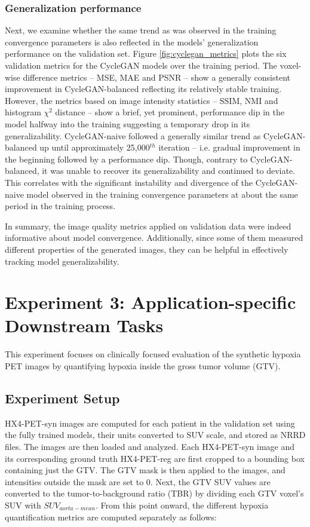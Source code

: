 \subsubsection{Generalization performance} 
Next, we examine whether the same trend as was observed in the training convergence parameters is also reflected in the models' generalization performance on the validation set. Figure \ref{fig:cyclegan_metrics} plots the six validation metrics for the CycleGAN models over the training period. The voxel-wise difference metrics -- MSE, MAE and PSNR -- show a generally consistent improvement in CycleGAN-balanced reflecting its relatively stable training. However, the metrics based on image intensity statistics -- SSIM, NMI and histogram $\chi^2$ distance -- show a brief, yet prominent, performance dip in the model halfway into the training suggesting a temporary drop in its generalizability. CycleGAN-naive followed a generally similar trend as CycleGAN-balanced up until approximately 25,000$^{th}$ iteration -- i.e. gradual improvement in the beginning followed by a performance dip. Though, contrary to CycleGAN-balanced, it was unable to recover its generalizability and continued to deviate. This correlates with the significant instability and divergence of the CycleGAN-naive model observed in the training convergence parameters at about the same period in the training process.

In summary, the image quality metrics applied on validation data were indeed informative about model convergence. Additionally, since some of them measured different properties of the generated images, they can be helpful in effectively tracking model generalizability.



\section{Experiment 3: Application-specific Downstream Tasks}
\label{Expt_3}
This experiment focuses on clinically focused evaluation of the synthetic hypoxia PET images by quantifying hypoxia inside the gross tumor volume (GTV).


\subsection{Experiment Setup}
HX4-PET-syn images are computed for each patient in the validation set using the fully trained models, their units converted to SUV scale, and stored as NRRD files. The images are then loaded and analyzed. Each HX4-PET-syn image and its corresponding ground truth HX4-PET-reg are first cropped to a bounding box containing just the GTV. The GTV mask is then applied to the images, and intensities outside the mask are set to 0. Next, the GTV SUV values are converted to the tumor-to-background ratio (TBR) by dividing each GTV voxel's SUV with $SUV_{aorta-mean}$. From this point onward, the different hypoxia quantification metrics are computed separately as follows:

